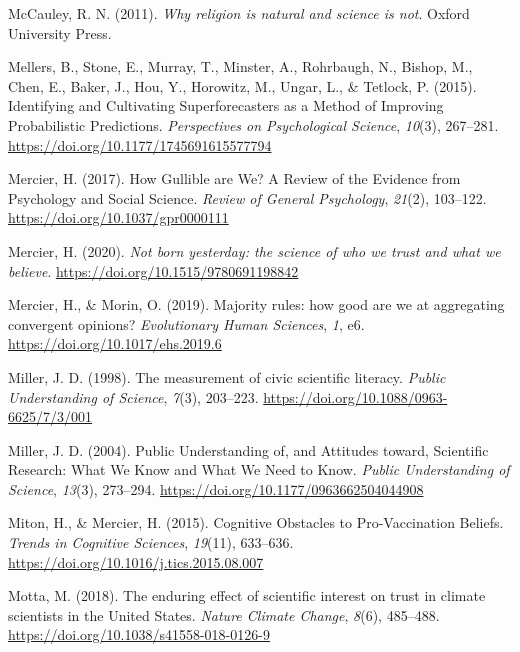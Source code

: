 \documentclass[
  jou,
  floatsintext,
  longtable,
  nolmodern,
  notxfonts,
  notimes,
  colorlinks=true,linkcolor=blue,citecolor=blue,urlcolor=blue]{apa7}
\newlength{\cslhangindent}
\newenvironment{CSLReferences}[2] %
 {\begin{list}{}{%
  \setlength{\itemindent}{0pt}
  \setlength{\leftmargin}{0pt}
  \setlength{\parsep}{0pt}
  \ifodd #1
   \setlength{\leftmargin}{\cslhangindent}
   \setlength{\itemindent}{-1\cslhangindent}
  \fi
  \setlength{\itemsep}{#2\baselineskip}}}
 {\end{list}}
\begin{document}
\begin{CSLReferences}{1}{0}
McCauley, R. N. (2011). \emph{Why religion is natural and science is
not}. Oxford University Press.

Mellers, B., Stone, E., Murray, T., Minster, A., Rohrbaugh, N., Bishop,
M., Chen, E., Baker, J., Hou, Y., Horowitz, M., Ungar, L., \& Tetlock,
P. (2015). Identifying and Cultivating Superforecasters as a Method of
Improving Probabilistic Predictions. \emph{Perspectives on Psychological
Science}, \emph{10}(3), 267--281.
\url{https://doi.org/10.1177/1745691615577794}

Mercier, H. (2017). How Gullible are We? A Review of the Evidence from
Psychology and Social Science. \emph{Review of General Psychology},
\emph{21}(2), 103--122. \url{https://doi.org/10.1037/gpr0000111}

Mercier, H. (2020). \emph{Not born yesterday: the science of who we
trust and what we believe}. \url{https://doi.org/10.1515/9780691198842}

Mercier, H., \& Morin, O. (2019). Majority rules: how good are we at
aggregating convergent opinions? \emph{Evolutionary Human Sciences},
\emph{1}, e6. \url{https://doi.org/10.1017/ehs.2019.6}

Miller, J. D. (1998). The measurement of civic scientific literacy.
\emph{Public Understanding of Science}, \emph{7}(3), 203--223.
\url{https://doi.org/10.1088/0963-6625/7/3/001}

Miller, J. D. (2004). Public Understanding of, and Attitudes toward,
Scientific Research: What We Know and What We Need to Know. \emph{Public
Understanding of Science}, \emph{13}(3), 273--294.
\url{https://doi.org/10.1177/0963662504044908}

Miton, H., \& Mercier, H. (2015). Cognitive Obstacles to Pro-Vaccination
Beliefs. \emph{Trends in Cognitive Sciences}, \emph{19}(11), 633--636.
\url{https://doi.org/10.1016/j.tics.2015.08.007}

Motta, M. (2018). The enduring effect of scientific interest on trust in
climate scientists in the United States. \emph{Nature Climate Change},
\emph{8}(6), 485--488. \url{https://doi.org/10.1038/s41558-018-0126-9}


\end{CSLReferences}
\end{document}
